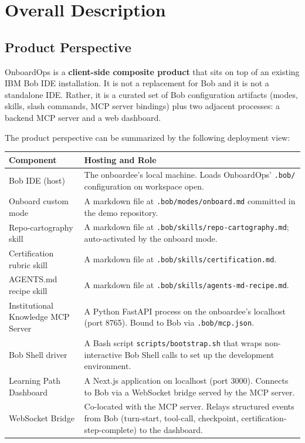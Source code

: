 \documentclass[11pt,letterpaper]{article}
\begin{document}
\section{Overall Description}

\subsection{Product Perspective}

OnboardOps is a \textbf{client-side composite product} that sits on top of an existing IBM Bob IDE installation. It is not a replacement for Bob and it is not a standalone IDE. Rather, it is a curated set of Bob configuration artifacts (modes, skills, slash commands, MCP server bindings) plus two adjacent processes: a backend MCP server and a web dashboard.

The product perspective can be summarized by the following deployment view:

\begin{center}
\begin{tabularx}{\textwidth}{|l|X|}
\hline
\textbf{Component} & \textbf{Hosting and Role} \\
\hline
Bob IDE (host) & The onboardee's local machine. Loads OnboardOps' \texttt{.bob/} configuration on workspace open. \\
\hline
Onboard custom mode & A markdown file at \texttt{.bob/modes/onboard.md} committed in the demo repository. \\
\hline
Repo-cartography skill & A markdown file at \texttt{.bob/skills/repo-cartography.md}; auto-activated by the onboard mode. \\
\hline
Certification rubric skill & A markdown file at \texttt{.bob/skills/certification.md}. \\
\hline
AGENTS.md recipe skill & A markdown file at \texttt{.bob/skills/agents-md-recipe.md}. \\
\hline
Institutional Knowledge MCP Server & A Python FastAPI process on the onboardee's localhost (port 8765). Bound to Bob via \texttt{.bob/mcp.json}. \\
\hline
Bob Shell driver & A Bash script \texttt{scripts/bootstrap.sh} that wraps non-interactive Bob Shell calls to set up the development environment. \\
\hline
Learning Path Dashboard & A Next.js application on localhost (port 3000). Connects to Bob via a WebSocket bridge served by the MCP server. \\
\hline
WebSocket Bridge & Co-located with the MCP server. Relays structured events from Bob (turn-start, tool-call, checkpoint, certification-step-complete) to the dashboard. \\
\hline
\end{tabularx}
\end{center}
\end{document}
